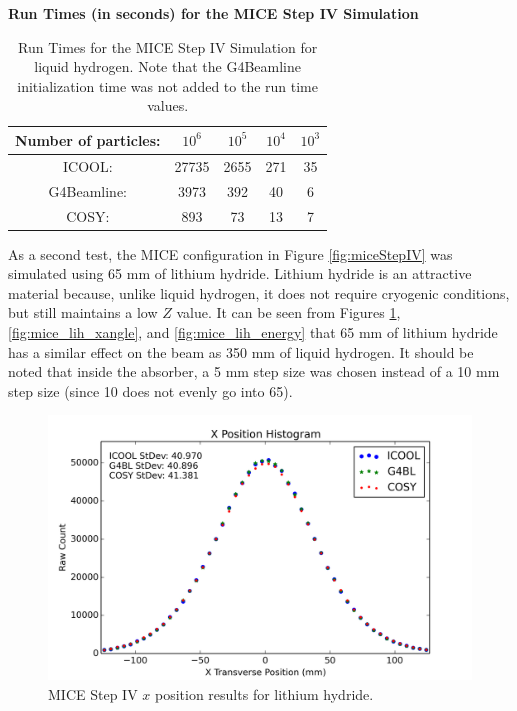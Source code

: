 \begin{table}
\caption*{\textbf{Run Times (in seconds) for the MICE Step IV Simulation}}
\begin{center}
\begin{tabularx}{0.6\textwidth}{ccccc}
\hline \hline
Number of particles: & $10^6$ & $10^5$ & $10^4$ & $10^3$\\
\hline
ICOOL: & 27735 & 2655 & 271 & 35\vspace{-12pt}\\
G4Beamline: & 3973 & 392 & 40 & 6\vspace{-12pt}\\
COSY: & 893 & 73 & 13 & 7\\
\hline
\end{tabularx}
\end{center}
\caption[Run Times for the MICE Step IV Simulation.]{Run Times for the MICE Step IV Simulation for liquid hydrogen. Note that the G4Beamline initialization time was not added to the run time values.}
\label{tbl:mice_times}
\end{table}

As a second test, the MICE configuration in Figure \ref{fig:miceStepIV} was simulated using 65 mm of lithium hydride. Lithium hydride is an attractive material because, unlike liquid hydrogen, it does not require cryogenic conditions, but still maintains a low $Z$ value. It can be seen from Figures \ref{fig:mice_lih_x}, \ref{fig:mice_lih_xangle}, and \ref{fig:mice_lih_energy} that 65 mm of lithium hydride has a similar effect on the beam as 350 mm of liquid hydrogen. It should be noted that inside the absorber, a 5 mm step size was chosen instead of a 10 mm step size (since 10 does not evenly go into 65).

\begin{figure}[H]
  \centering
    \includegraphics[width=\textwidth]{MICE data/LiH/x} 
  \caption{MICE Step IV $x$ position results for lithium hydride.}
  \label{fig:mice_lih_x}
\end{figure}

